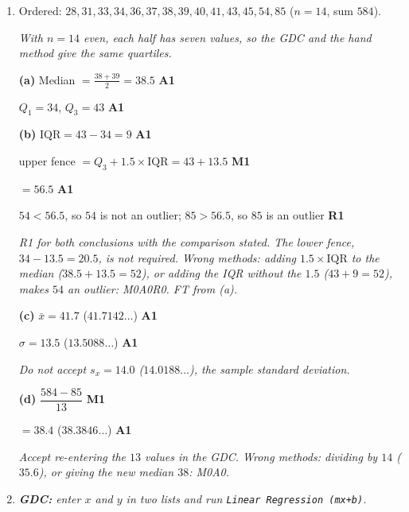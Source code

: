 \documentclass[12pt, twoside]{article}
\begin{document}
\begin{enumerate}[itemsep=0.3cm]
\newpage

\item[5.] [Maximum mark: 10]

Ordered: $28, 31, 33, 34, 36, 37, 38, 39, 40, 41, 43, 45, 54, 85$
\quad ($n = 14$, sum $584$).

\emph{With $n = 14$ even, each half has seven values, so the GDC and the hand
method give the same quartiles.}

\textbf{(a)} Median $= \frac{38 + 39}{2} = 38.5$ \hfill \textbf{A1}

$Q_{1} = 34$, \quad $Q_{3} = 43$ \hfill \textbf{A1}

\textbf{(b)} $\text{IQR} = 43 - 34 = 9$ \hfill \textbf{A1}

upper fence $= Q_{3} + 1.5 \times \text{IQR} = 43 + 13.5$ \hfill \textbf{M1}

$= 56.5$ \hfill \textbf{A1}

$54 < 56.5$, so $54$ is not an outlier; $85 > 56.5$, so $85$ is an
outlier \hfill \textbf{R1}

\emph{R1 for both conclusions with the comparison stated. The lower fence,
$34 - 13.5 = 20.5$, is not required. Wrong methods: adding $1.5 \times
\text{IQR}$ to the median ($38.5 + 13.5 = 52$), or adding the IQR without
the $1.5$ ($43 + 9 = 52$), makes $54$ an outlier: M0A0R0. FT from (a).}

\textbf{(c)} $\bar{x} = 41.7$ \quad ($41.7142\ldots$) \hfill \textbf{A1}

$\sigma = 13.5$ \quad ($13.5088\ldots$) \hfill \textbf{A1}

\emph{Do not accept $s_{x} = 14.0$ ($14.0188\ldots$), the sample standard
deviation.}

\textbf{(d)} $\dfrac{584 - 85}{13}$ \hfill \textbf{M1}

$= 38.4$ \quad ($38.3846\ldots$) \hfill \textbf{A1}

\emph{Accept re-entering the $13$ values in the GDC. Wrong methods:
dividing by $14$ ($35.6$), or giving the new median $38$: M0A0.}

\newpage

\item[6.] [Maximum mark: 8]

\emph{\textbf{GDC:} enter $x$ and $y$ in two lists and run
\texttt{Linear Regression (mx+b)}.}


\end{enumerate}
\end{document}
